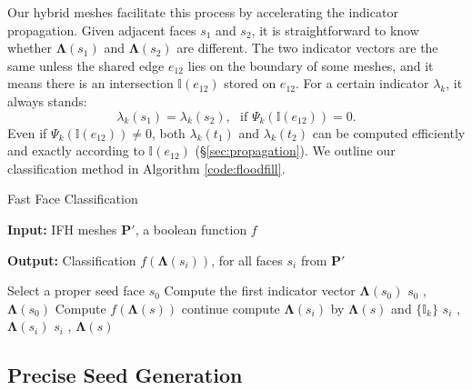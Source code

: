 \documentclass[10pt,journal,compsoc]{IEEEtran}
\begin{document}
Our hybrid meshes facilitate this process by accelerating the indicator propagation. Given adjacent faces $s_1$ and $s_2$, it is straightforward to know whether $\bm{\Lambda}(s_1)$ and $\bm{\Lambda}(s_2)$ are different. The two indicator vectors are the same unless the shared edge $e_{12}$ lies on the boundary of some meshes, and it means there is an intersection $\mathbb{I}(e_{12})$ stored on $e_{12}$. For a certain indicator $\lambda_k$, it always stands:
\begin{equation}
\label{eq:eq1}
{\lambda_k}(s_1) = {\lambda_k}(s_2),\ \ \  \mbox{if }\Psi_k(\mathbb{I}(e_{12}))= 0.
\end{equation}
Even if $\Psi_k(\mathbb{I}(e_{12})) \neq 0$, both $\lambda_k(t_1)$ and $\lambda_k(t_2)$ can be computed efficiently and exactly according to $\mathbb{I}(e_{12})$ (\S\ref{sec:propagation}). We outline our classification method in Algorithm \ref{code:floodfill}.

\begin{algorithm}
\caption{Fast Face Classification}
\label{code:floodfill}
\textbf{Input: } IFH meshes $\bm{P'}$, a boolean function $f$

\textbf{Output: } Classification $f(\bm{\Lambda}(s_i))$, for all faces $s_i$ from $\bm{P'}$


\begin{algorithmic}[1]
\State Select a proper seed face $s_0$
\State Compute the first indicator vector $\boldsymbol{\Lambda}(s_0)$
\State {} { $s_0$ , $\boldsymbol{\Lambda}(s_0)$}
\State
{}
    \State Compute $f(\boldsymbol{\Lambda}(s))$
            \State continue
        \EndIf
            \State compute $\boldsymbol{\Lambda}(s_i)$ by $\boldsymbol{\Lambda}(s)$ and $\{{\mathbb{I}}_k\}$
            \State {} { $s_i$ , $\boldsymbol{\Lambda}(s_i)$}
        \Else
            \State {} { $s_i$ , $\boldsymbol{\Lambda}(s)$}
        \EndIf
    \EndFor
\EndFunction
\end{algorithmic}
\end{algorithm}

\iffalse
\subsection{Precise Seed Generation}
\end{document}
